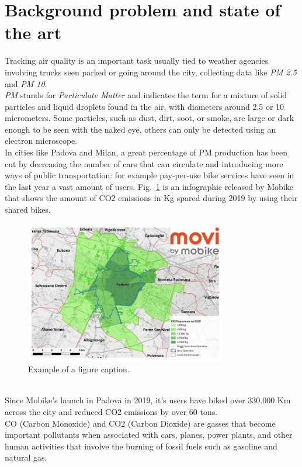 \documentclass[conference]{IEEEtran}
\begin{document}
\section{Background problem and state of the art}\label{bck}
	Tracking air quality is an important task usually tied to weather agencies involving trucks seen parked or going around the city, collecting data like \textit{PM 2.5} and \textit{PM 10}.\\
	\textit{PM} stands for \textit{Particulate Matter} and indicates the term for a mixture of solid particles and liquid droplets found in the air, with diameters around 2.5 or 10 micrometers.
	Some particles, such as dust, dirt, soot, or smoke, are large or dark enough to be seen with the naked eye, others can only be detected using an electron microscope\cite{particles}.\\
	In cities like Padova and Milan\cite{milano}, a great percentage of PM production has been cut by decreasing the number of cars that can circulate and introducing more ways of public transportation: for example pay-per-use bike services have seen in the last year a vast amount of users.
	Fig.~\ref{mobi} is an infographic released by Mobike that shows the amount of CO2 emissions in Kg spared during 2019 by using their shared bikes.
	\begin{figure}[htbp]
		\centerline{\includegraphics[width=8.8cm]{fig3.jpg}}
		\caption{Example of a figure caption.\cite{mobike_pd}}
		\label{mobi}
	\end{figure}\\
	Since Mobike's launch in Padova in 2019, it's users have biked over 330.000 Km across the city and reduced CO{\footnotesize 2} emissions by over 60 tons.\\
	CO (Carbon Monoxide) and CO{\footnotesize 2} (Carbon Dioxide) are gasses that become important pollutants when associated with cars, planes, power plants, and other human activities that involve the burning of fossil fuels such as gasoline and natural gas\cite{co2}.\\
\end{document}

